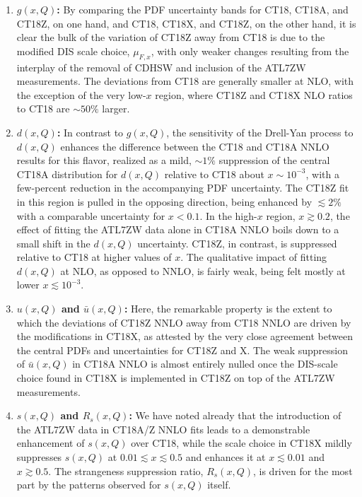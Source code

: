 \begin{enumerate}
\item {\bf $g(x,Q)$:} By comparing the PDF uncertainty bands for CT18,
CT18A, and CT18Z, on one hand, and CT18, CT18X, and CT18Z, on the
other hand, it is clear the bulk of the variation of CT18Z away from
CT18 is due to the modified DIS scale choice, $\mu_{F,x}$, with only
weaker changes resulting from the interplay of the removal of CDHSW
and inclusion of the ATL7ZW measurements. The deviations from CT18
are generally smaller at NLO, with the exception of the very low-$x$
region, where CT18Z and CT18X NLO ratios to CT18 are $\sim\! 50\%$ larger.
%
\item {\bf $d(x,Q)$:} In contrast to $g(x,Q)$, the sensitivity
of the Drell-Yan process to $d(x,Q)$ enhances the difference
between the CT18 and CT18A NNLO results for this flavor, realized as a
mild, $\sim\!1\%$ suppression of the central CT18A distribution for
$d(x,Q)$ relative to CT18 about $x\!\sim\!10^{-3}$, with a
few-percent reduction in the accompanying PDF uncertainty. The CT18Z
fit in this region is pulled in the opposing direction, being enhanced
by $\lesssim\!2\%$ with a comparable uncertainty for $x\!<\! 0.1$. In
the high-$x$ region,
$x \gtrsim 0.2$, the effect of fitting the ATL7ZW data
alone in CT18A NNLO boils down to a small shift in the $d(x,Q)$
uncertainty. CT18Z, in contrast, is suppressed relative to CT18 at higher values of $x$. 
The qualitative impact of fitting $d(x,Q)$ at NLO, as opposed
to NNLO, is fairly weak, being felt mostly at lower $x\!\lesssim\!
10^{-3}$.
%
\item {\bf $u(x,Q)$ and $\bar u(x,Q)$:} Here, the remarkable property
is the extent to which the deviations of CT18Z NNLO away from CT18
NNLO are driven by the modifications in CT18X, as attested by the very
close agreement between the central PDFs and uncertainties 
for CT18Z and X. The weak suppression of $\bar{u}(x,Q)$
in CT18A NNLO is almost entirely nulled once the DIS-scale
choice found in CT18X is implemented in CT18Z on top of the ATL7ZW measurements.
%
\item {\bf $s(x,Q)$ and $R_s(x,Q)$:} We have noted already
that the introduction of the ATL7ZW data in
CT18A/Z NNLO fits leads to a demonstrable enhancement of $s(x,Q)$ over
CT18, while the scale choice in CT18X mildly suppresses $s(x,Q)$ at
$0.01 \lesssim x \lesssim 0.5$ and enhances it at $x \lesssim 0.01$ and 
$x \gtrsim 0.5$. The strangeness suppression ratio, $R_s(x,Q)$,
is driven for the most part by the patterns observed for $s(x,Q)$ itself.
\end{enumerate}


